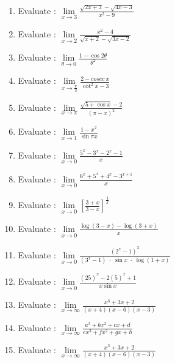 \documentclass[14pt]{article}
\begin{document}
\begin{multicols}{2}
\begin{enumerate}[resume]
\item Evaluate : $ \lim\limits_{x \to 3} \frac{ \sqrt{ 2x + 3 } - \sqrt{ 4x - 3 } }{ x^2 - 9 } $

\item Evaluate : $ \lim\limits_{x \to 2} \frac{ x^2 - 4 }{ \sqrt{ x + 2 } - \sqrt{ 3x - 2 }  } $

 \item Evaluate : $ \lim\limits_{ \theta \to 0} \frac{ 1 -  \cos 2\theta }{ \theta ^2  } $
 
\item Evaluate : $ \lim\limits_{ x \to \frac {\pi}{3} } \frac{ 2 -  cosec\ x }{ \cot^2 x - 3  } $
 
\item Evaluate : $ \lim\limits_{ x \to \pi } \frac{ \sqrt{ 5 + \cos x } -2 }{ ( \pi - x )^2  } $
 
\item Evaluate : $ \lim\limits_{ x \to 1 } \frac{ 1 - x^2 }{ \sin \pi x  } $
 
 
 
 \item Evaluate : $ \lim\limits_{ x \to 0 } \frac{ 5^x - 3^x - 2^x - 1 }{ x} $
 
 \item Evaluate : $ \lim\limits_{ x \to 0 } \frac{ 6^x + 5^x + 4^x - 3^{x+1} }{ x} $
 
 \item Evaluate : $ \lim\limits_{ x \to 0 } \left[ \frac{ 3+x }{3-x}\right]^{\frac{1}{x}} $
 

  \item Evaluate : $ \lim\limits_{ x \to 0 } \frac{ \log (3-x) - \log (3+x) }{ x} $
  
  
   \item Evaluate : $ \lim\limits_{ x \to 0 } \frac{ \left(2^x - 1\right)^3 }{ (3^x - 1)\; \cdot \;\sin x \; \cdot \; \log (1+x)} $
  
  
 \item Evaluate : $ \lim\limits_{ x \to 0 } \frac{ (25)^x - 2(5)^x +1}{ x\sin x} $
 \item Evaluate : $ \lim\limits_{ x \to \infty} \frac{x^3+ 3x+2}{(x+4)(x-6)(x-3)} $

 \item Evaluate : $ \lim\limits_{ x \to \infty } \frac{ a^3 + bx^2+cx +d}{ ex^3+fx^2+gx+h} $

 \item Evaluate : $ \lim\limits_{ x \to \infty} \frac{x^3+ 3x+2}{(x+4)(x-6)(x-3)} $


\end{enumerate}
\end{multicols}
\end{document}
